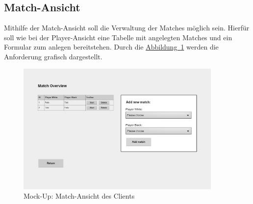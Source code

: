 \subsection{Match-Ansicht}\label{sec:matchView}
Mithilfe der Match-Ansicht soll die Verwaltung der Matches möglich sein. Hierfür soll wie bei der Player-Ansicht eine Tabelle mit angelegten Matches und ein Formular zum anlegen bereitstehen. Durch die \hyperref[fig:matchView]{Abbildung~\ref{fig:matchView}} werden die Anforderung grafisch dargestellt.
\begin{figure}[htb]
	\includegraphics[width=0.9\textwidth]{images/match-view.png}
	\caption{Mock-Up: Match-Ansicht des Clients}
	\label{fig:matchView}
\end{figure}

